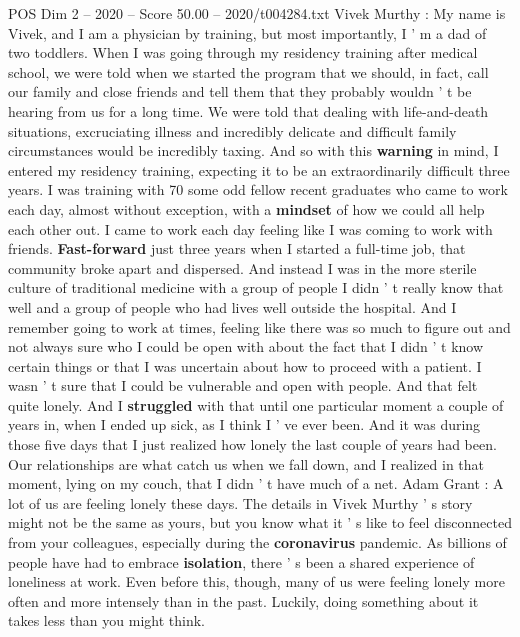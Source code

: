 \begin{textsample}{POS Dim 2 – 2020 – Score 50.00 – 2020/t004284.txt}  \label{ex:f2_pos_003}
Vivek Murthy : My name is Vivek, and I am a physician by training, but most importantly, I ' m a dad of two toddlers.
When I was going through my residency training after medical school, we were told when we started the program that we should, in fact, call our family and close friends and tell them that they probably wouldn ' t be hearing from us for a long time.
We were told that dealing with life-and-death situations, excruciating illness and incredibly delicate and difficult family circumstances would be incredibly taxing.
And so with this \textbf{warning} in mind, I entered my residency training, expecting it to be an extraordinarily difficult three years.
I was training with 70 some odd fellow recent graduates who came to work each day, almost without exception, with a \textbf{mindset} of how we could all help each other out.
I came to work each day feeling like I was coming to work with friends. \textbf{Fast-forward} just three years when I started a full-time job, that community broke apart and dispersed.
And instead I was in the more sterile culture of traditional medicine with a group of people I didn ' t really know that well and a group of people who had lives well outside the hospital.
And I remember going to work at times, feeling like there was so much to figure out and not always sure who I could be open with about the fact that I didn ' t know certain things or that I was uncertain about how to proceed with a patient.
I wasn ' t sure that I could be vulnerable and open with people.
And that felt quite lonely.
And I \textbf{struggled} with that until one particular moment a couple of years in, when I ended up sick, as I think I ' ve ever been.
And it was during those five days that I just realized how lonely the last couple of years had been.
Our relationships are what catch us when we fall down, and I realized in that moment, lying on my couch, that I didn ' t have much of a net.
Adam Grant : A lot of us are feeling lonely these days.
The details in Vivek Murthy ' s story might not be the same as yours, but you know what it ' s like to feel disconnected from your colleagues, especially during the \textbf{coronavirus} pandemic.
As billions of people have had to embrace \textbf{isolation}, there ' s been a shared experience of loneliness at work.
Even before this, though, many of us were feeling lonely more often and more intensely than in the past.
Luckily, doing something about it takes less than you might think.

\end{textsample}
